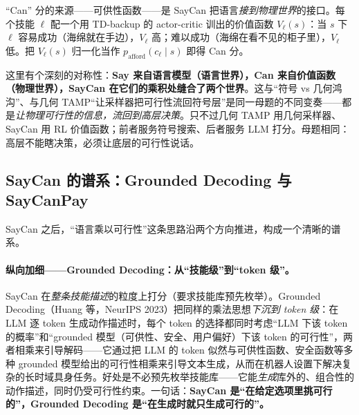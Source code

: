 \noindent “Can” 分的来源——可供性函数——是 SayCan 把语言\emph{接到物理世界}的接口。每个技能 $\ell$ 配一个用 TD-backup 的 actor-critic 训出的价值函数 $V_\ell(s)$：当 $s$ 下 $\ell$ 容易成功（海绵就在手边），$V_\ell$ 高；难以成功（海绵在看不见的柜子里），$V_\ell$ 低。把 $V_\ell(s)$ 归一化当作 $p_{\text{afford}}(c_\ell\mid s)$ 即得 Can 分。

\begin{insight}
这里有个深刻的对称性：\textbf{Say 来自语言模型（语言世界），Can 来自价值函数（物理世界），SayCan 在它们的乘积处缝合了两个世界}。这与“符号 vs 几何鸿沟”、与几何 TAMP“让采样器把可行性流回符号层”是同一母题的不同变奏——都是\emph{让物理可行性的信息，流回到高层决策}。只不过几何 TAMP 用几何采样器、SayCan 用 RL 价值函数；前者服务符号搜索、后者服务 LLM 打分。母题相同：高层不能瞎决策，必须让底层的可行性说话。
\end{insight}

\subsection{SayCan 的谱系：Grounded Decoding 与 SayCanPay}
\label{sec:saycan-family}

SayCan 之后，“语言乘以可行性”这条思路沿两个方向推进，构成一个清晰的谱系。

\paragraph{纵向加细——Grounded Decoding：从“技能级”到“token 级”。}
SayCan 在\emph{整条技能描述}的粒度上打分（要求技能库预先枚举）。Grounded Decoding（Huang 等，NeurIPS 2023）把同样的乘法思想\emph{下沉到 token 级}：在 LLM 逐 token 生成动作描述时，每个 token 的选择都同时考虑“LLM 下该 token 的概率”和“grounded 模型（可供性、安全、用户偏好）下该 token 的可行性”，两者相乘来引导解码——它通过把 LLM 的 token 似然与可供性函数、安全函数等多种 grounded 模型给出的可行性相乘来引导文本生成，从而在机器人设置下解决复杂的长时域具身任务\cite{huang2023grounded}。好处是不必预先枚举技能库——它能\emph{生成}库外的、组合性的动作描述，同时仍受可行性约束。一句话：\textbf{SayCan 是“在给定选项里挑可行的”，Grounded Decoding 是“在生成时就只生成可行的”。}

